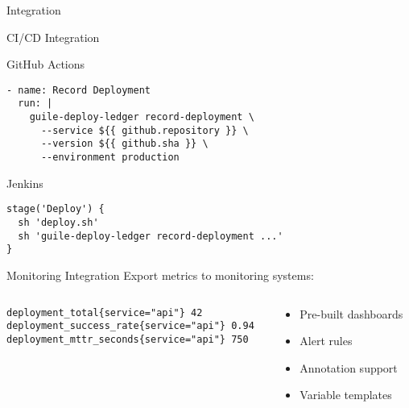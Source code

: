 \documentclass[presentation,aspectratio=169]{beamer}
\begin{document}
\begin{frame}[label={sec:orgfa5ded4},fragile]{Integration}
 \begin{block}{CI/CD Integration}
\begin{block}{GitHub Actions}
\begin{verbatim}
- name: Record Deployment
  run: |
    guile-deploy-ledger record-deployment \
      --service ${{ github.repository }} \
      --version ${{ github.sha }} \
      --environment production
\end{verbatim}
\end{block}
\begin{block}{Jenkins}
\begin{verbatim}
stage('Deploy') {
  sh 'deploy.sh'
  sh 'guile-deploy-ledger record-deployment ...'
}
\end{verbatim}
\end{block}
\end{block}
\begin{block}{Monitoring Integration}
Export metrics to monitoring systems:
\begin{columns}
\begin{column}{0.5\columnwidth}
\begin{verbatim}
deployment_total{service="api"} 42
deployment_success_rate{service="api"} 0.94
deployment_mttr_seconds{service="api"} 750
\end{verbatim}
\end{column}
\begin{column}{0.5\columnwidth}
\begin{itemize}
\item Pre-built dashboards
\item Alert rules
\item Annotation support
\item Variable templates
\end{itemize}
\end{column}
\end{columns}
\end{block}
\end{frame}
\end{document}
